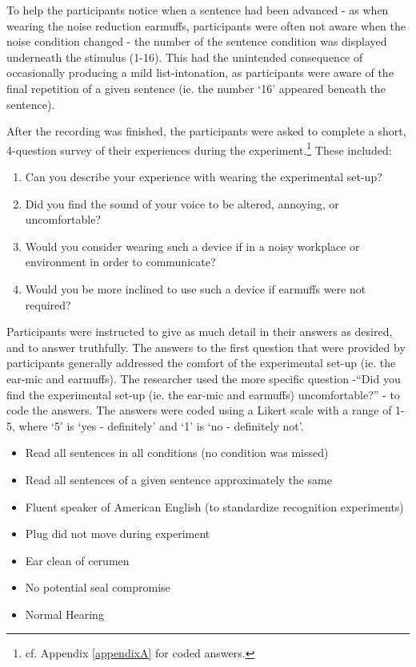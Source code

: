 To help the participants notice when a sentence had been advanced - as when wearing the noise reduction earmuffs, participants were often not aware when the noise condition changed - the number of the sentence condition was displayed underneath the stimulus (1-16).  This had the unintended consequence of occasionally producing a mild list-intonation, as participants were aware of the final repetition of a given sentence (ie. the number `16' appeared beneath the sentence). 

After the recording was finished, the participants were asked to complete a short, 4-question survey of their experiences during the experiment.\footnote{cf. Appendix \DIFdelbegin {}\DIFdelend \ref{appendixA} for coded answers.}  These included:
\begin{enumerate}
  \item{Can you describe your experience with wearing the experimental set-up?}
  \item{Did you find the sound of your voice to be altered, annoying, or uncomfortable?}
  \item{Would you consider wearing such a device if in a noisy workplace or environment in order to communicate?}
  \item{Would you be more inclined to use such a device if earmuffs were not required?}
\end{enumerate}

Participants were instructed to give as much detail in their answers as desired, and to answer truthfully.  The answers to the first question that were provided by participants generally addressed the comfort of the experimental set-up (ie. the ear-mic and earmuffs).  The researcher used the more specific question -``Did you find the experimental set-up (ie. the ear-mic and earmuffs) uncomfortable?'' - to code the answers. The answers were coded using a Likert scale with a range of 1-5, where `5' is `yes - definitely' and `1' is `no - definitely not'.

\DIFdelbegin %
\DIFdelend \DIFaddbegin {}\begin{itemize}
\item{Read all sentences in all conditions (no condition was missed)}
\item{Read all sentences of a given sentence approximately the same}
\item{Fluent speaker of American English (to standardize recognition experiments)}
\item{Plug did not move during experiment}
\item{Ear clean of cerumen}
\item{No potential seal compromise}
\item{Normal Hearing}
\end{itemize}

